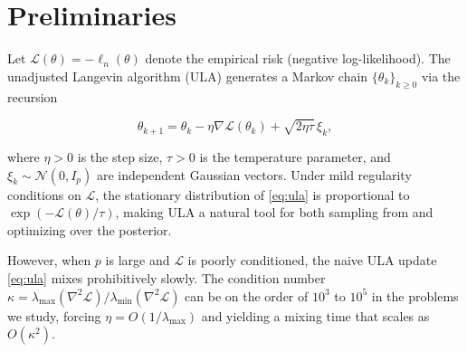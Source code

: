 \section{Preliminaries}

Let $\mathcal{L}(\theta) = -\ell_{n}(\theta)$ denote the empirical risk (negative log-likelihood). The unadjusted Langevin algorithm (ULA) \cite{roberts1996} generates a Markov chain $\{\theta_{k}\}_{k \ge 0}$ via the recursion

\begin{equation}\label{eq:ula}
\theta_{k+1} = \theta_{k} - \eta \nabla\mathcal{L}(\theta_{k}) + \sqrt{2\eta\tau}\,\xi_{k},
\end{equation}

\noindent where $\eta > 0$ is the step size, $\tau > 0$ is the temperature parameter, and $\xi_{k} \sim \mathcal{N}(0, I_{p})$ are independent Gaussian vectors. Under mild regularity conditions on $\mathcal{L}$, the stationary distribution of \eqref{eq:ula} is proportional to $\exp(-\mathcal{L}(\theta)/\tau)$, making ULA a natural tool for both sampling from and optimizing over the posterior.

However, when $p$ is large and $\mathcal{L}$ is poorly conditioned, the naive ULA update \eqref{eq:ula} mixes prohibitively slowly. The condition number $\kappa = \lambda_{\max}(\nabla^{2}\mathcal{L}) / \lambda_{\min}(\nabla^{2}\mathcal{L})$ can be on the order of $10^{3}$ to $10^{5}$ in the problems we study, forcing $\eta = O(1/\lambda_{\max})$ and yielding a mixing time that scales as $O(\kappa^{2})$.
